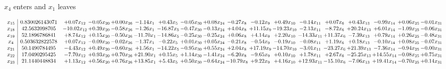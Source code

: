 \documentclass[9pt]{article}
\begin{document}
 $ x_{4} $ enters and $ x_{1} $ leaves 

 \[\begin{array}{c| c c@{\hskip 2pt} c@{\hskip 2pt} c@{\hskip 2pt} c@{\hskip 2pt} c@{\hskip 2pt} c@{\hskip 2pt} c@{\hskip 2pt} c@{\hskip 2pt} c@{\hskip 2pt} c@{\hskip 2pt} c@{\hskip 2pt} c@{\hskip 2pt} c@{\hskip 2pt} c@{\hskip 2pt} c@{\hskip 2pt} c@{\hskip 2pt} }
 x_{15}   &  0.830026143071 & +  0.07 x_{12} & -0.05 x_{20} & +  0.00 x_{26} & -1.14 x_{1} & +  0.43 x_{5} & -0.05 x_{30} & +  0.08 x_{24} & -0.27 x_{8} & -0.12 x_{9} & +  0.49 x_{10} & -0.14 x_{11} & +  0.07 x_{6} & +  0.43 x_{13} & -0.99 x_{14} & +  0.06 x_{25} & -0.01 x_{31}\\
 x_{18}   &  42.5632098705 & -10.02 x_{12} & +  0.39 x_{20} & -0.58 x_{26} & -1.26 x_{1} & -16.87 x_{5} & -0.47 x_{30} & -0.13 x_{24} & +  4.04 x_{8} & + 11.15 x_{9} & -19.23 x_{10} & -2.13 x_{11} & -8.72 x_{6} & + 20.24 x_{13} & +  6.01 x_{14} & -1.09 x_{25} & -0.06 x_{31}\\
 x_{19}   &  52.1896786841 & +  8.74 x_{12} & +  0.15 x_{20} & -0.50 x_{26} & -11.70 x_{1} & -14.86 x_{5} & -0.25 x_{30} & -0.25 x_{24} & +  0.06 x_{8} & +  4.14 x_{9} & +  2.20 x_{10} & -14.33 x_{11} & + 11.37 x_{6} & -7.39 x_{13} & +  0.79 x_{14} & +  0.26 x_{25} & -0.48 x_{31}\\
 x_{4}   &  0.503632822578 & +  0.07 x_{12} & -0.09 x_{20} & -0.02 x_{26} & -1.37 x_{1} & -0.22 x_{5} & +  0.01 x_{30} & +  0.05 x_{24} & -0.21 x_{8} & -0.54 x_{9} & -0.19 x_{10} & -0.08 x_{11} & +  1.19 x_{6} & +  0.18 x_{13} & -0.10 x_{14} & +  0.08 x_{25} & -0.07 x_{31}\\
 x_{21}   &  50.1490784495 & -4.43 x_{12} & +  0.49 x_{20} & -0.60 x_{26} & +  1.56 x_{1} & -14.22 x_{5} & -0.95 x_{30} & +  0.55 x_{24} & +  2.04 x_{8} & + 17.19 x_{9} & -14.70 x_{10} & -3.01 x_{11} & -23.27 x_{6} & + 21.39 x_{13} & -7.36 x_{14} & -0.94 x_{25} & -0.00 x_{31}\\
 x_{22}   &  17.0490295425 & -7.70 x_{12} & +  0.93 x_{20} & +  0.70 x_{26} & + 21.90 x_{1} & +  0.15 x_{5} & +  1.14 x_{30} & -1.41 x_{24} & -6.20 x_{8} & -9.65 x_{9} & +  0.10 x_{10} & +  1.78 x_{11} & +  2.67 x_{6} & -25.25 x_{13} & + 14.55 x_{14} & -0.08 x_{25} & +  0.75 x_{31}\\
 x_{23}   &  21.1440448834 & +  1.13 x_{12} & +  0.56 x_{20} & +  0.76 x_{26} & + 13.85 x_{1} & +  5.43 x_{5} & +  0.50 x_{30} & -0.64 x_{24} & -10.79 x_{8} & +  9.22 x_{9} & +  4.16 x_{10} & + 12.93 x_{11} & -15.10 x_{6} & -7.06 x_{13} & + 19.41 x_{14} & -0.70 x_{25} & +  0.14 x_{31}\\

\end{array}\]
\end{document}
